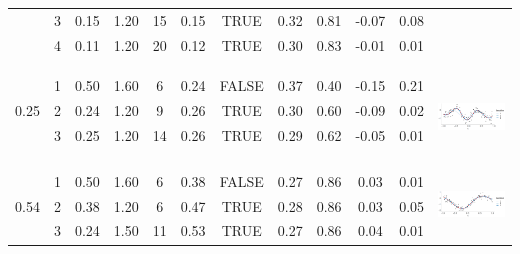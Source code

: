 \begin{table}
\begin{tabular}{ c c c c c c c c c c | c c}
 & 3 & 0.15 & 1.20 & 15 & 0.15 & TRUE & 0.32 & 0.81 & -0.07 & 0.08 & \\
 & 4 & 0.11 & 1.20 & 20 & 0.12 & TRUE & 0.30 & 0.83 & -0.01 & 0.01 & \\
 \\
 \\[1mm]
\arrayrulecolor{lightgray}\hline \\[-1mm]
\multirow{3}{*}{ 0.25} 
 & 1 & 0.50 & 1.60 & 6 & 0.24 & FALSE & 0.37 & 0.40 & -0.15 & 0.21 & \multirow{6}{*}{ \includegraphics[scale=0.25, trim = 0mm 10mm 0mm 5mm, clip]{tab1_diagnostic_4.png}}\\
 & 2 & 0.24 & 1.20 & 9 & 0.26 & TRUE & 0.30 & 0.60 & -0.09 & 0.02 & \\
 & 3 & 0.25 & 1.20 & 14 & 0.26 & TRUE & 0.29 & 0.62 & -0.05 & 0.01 & \\
 \\
 \\
 \\[1mm]
\arrayrulecolor{lightgray}\hline \\[-1mm]
\multirow{3}{*}{ 0.54} 
 & 1 & 0.50 & 1.60 & 6 & 0.38 & FALSE & 0.27 & 0.86 & 0.03 & 0.01 & \multirow{6}{*}{ \includegraphics[scale=0.25, trim = 0mm 10mm 0mm 3mm, clip]{tab1_diagnostic_5.png}}\\
 & 2 & 0.38 & 1.20 & 6 & 0.47 & TRUE & 0.28 & 0.86 & 0.03 & 0.05 & \\
 & 3 & 0.24 & 1.50 & 11 & 0.53 & TRUE & 0.27 & 0.86 & 0.04 & 0.01 & \\

\end{tabular}
\end{table}
